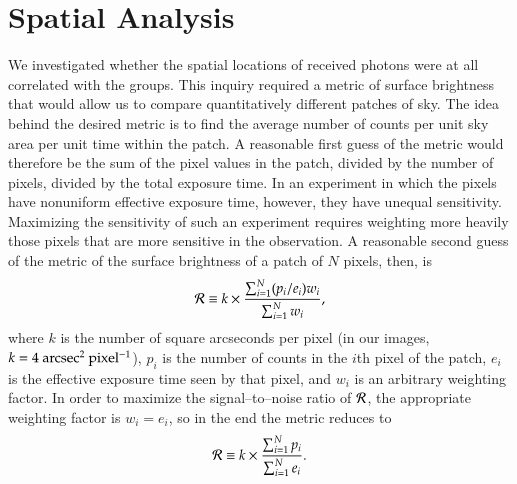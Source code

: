 \section{Spatial Analysis}
\label{groups_sec:spatial}
We investigated whether the spatial locations of received photons were
at all correlated with the groups.  This inquiry required a metric of
surface brightness that would allow us to compare quantitatively
different patches of sky.  The idea behind the desired metric is to
find the average number of counts per unit sky area per unit time
within the patch.  A reasonable first guess of the metric would
therefore be the sum of the pixel values in the patch, divided by the
number of pixels, divided by the total exposure time.  In an
experiment in which the pixels have nonuniform effective exposure
time, however, they have unequal sensitivity.  Maximizing the
sensitivity of such an experiment requires weighting more heavily
those pixels that are more sensitive in the observation.  A reasonable
second guess of the metric of the surface brightness of a patch of $N$
pixels, then, is
\[
\mathcal{R} \equiv k \times \frac{\sum_{i=1}^N(p_i/e_i)w_i}{\sum_{i=1}^Nw_i},
\]
where $k$ is the number of square arcseconds per pixel (in our images,
$k = 4 {\rm~arcsec^2~pixel^{-1}}$), $p_i$ is the number of counts in
the $i$th pixel of the patch, $e_i$ is the effective exposure time
seen by that pixel, and $w_i$ is an arbitrary weighting factor.  In
order to maximize the signal--to--noise ratio of $\mathcal{R}$, the appropriate
weighting factor is $w_i = e_i$, so in the end the metric reduces to
\begin{equation}
\label{groups_eq:metric}
\mathcal{R} \equiv k \times \frac{\sum_{i=1}^Np_i}{\sum_{i=1}^Ne_i}.
\end{equation}

